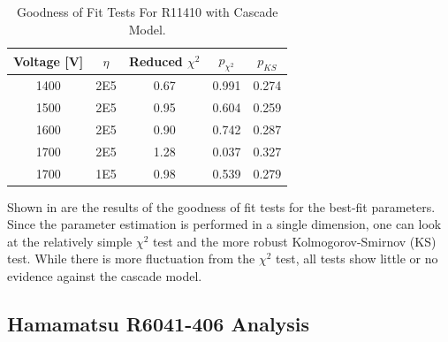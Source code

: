 \begin{table}
\centering

\begin{tabular}{|c|c|c|c|c|}
\hline
Voltage {[}V{]} & $\eta$ & Reduced $\chi^2$ & $p_{\chi^2}$ & $p_{KS}$  \\ \hline
1400 & 2E5 & 0.67 & 0.991 & 0.274 \\ \hline
1500 & 2E5 & 0.95 & 0.604 & 0.259 \\ \hline
1600 & 2E5 & 0.90 & 0.742 & 0.287 \\ \hline
1700 & 2E5 & 1.28 & 0.037 & 0.327 \\ \hline
1700 & 1E5 & 0.98 & 0.539 & 0.279 \\ \hline

\end{tabular}
\caption{Goodness of Fit Tests For R11410 with Cascade Model.}
\label{tab-gof}

\end{table}

Shown in  are the results of the goodness of fit tests for the best-fit parameters.  Since the parameter estimation is performed in a single dimension, one can look at the relatively simple $\chi^2$ test and the more robust Kolmogorov-Smirnov (KS) test.  While there is more fluctuation from the $\chi^2$ test, all tests show little or no evidence against the cascade model.





\subsection{Hamamatsu R6041-406 Analysis}
\label{sec:pmt_nerix_analysis}

